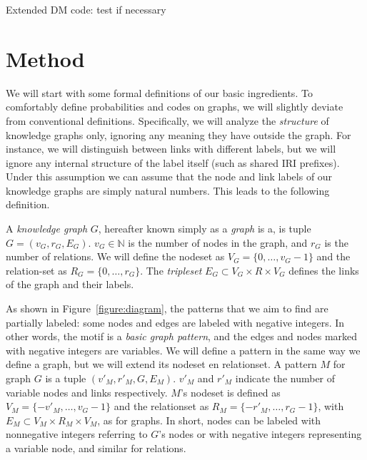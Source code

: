 \documentclass[11pt]{article}
\newcommand{\N}{{\mathbb N}}
\begin{document}
Extended DM code: test if necessary

\section{Method}

We will start with some formal definitions of our basic ingredients. To comfortably define probabilities and codes on graphs, we will slightly deviate from conventional definitions. Specifically, we will analyze the \emph{structure} of knowledge graphs only, ignoring any meaning they have outside the graph. For instance, we will distinguish between links with different labels, but we will ignore any internal structure of the label itself (such as shared IRI prefixes). Under this assumption we can assume that the node and link labels of our knowledge graphs are simply natural numbers. This leads to the following definition.

A \emph{knowledge graph} $G$, hereafter known simply as a \emph{graph} is a, is tuple $G = (v_G, r_G, E_G)$. $v_G \in \N$ is the number of nodes in the graph, and $r_G$ is the number of relations. We will define the nodeset as $V_G = \{0, \ldots, v_G-1\}$ and the relation-set as $R_G = \{0, \ldots, r_G\}$. The \emph{tripleset} $E_G \subset V_G \times R \times V_G$ defines the links of the graph and their labels. \footnotemark


As shown in Figure~\ref{figure:diagram}, the patterns that we aim to find are partially labeled: some nodes and edges are labeled with negative integers. In other words, the motif is a \emph{basic graph pattern}, and the edges and nodes marked with negative integers are variables. We will define a pattern in the same way we define a graph, but we will extend its nodeset en relationset. A pattern $M$ for graph $G$ is a tuple $(v'_M, r'_M, G, E_M)$. $v'_M$ and $r'_M$ indicate the number of variable nodes and links respectively. $M$'s nodeset is defined as $V_M = \{-v'_M, \ldots, v_G-1\}$ and the relationset as $R_M = \{-r'_M, \ldots, r_G-1\}$, with $E_M \subset V_M \times R_M \times V_M$, as for graphs. In short, nodes can be labeled with nonnegative integers referring to $G$'s nodes or with negative integers representing a variable node, and similar for relations.
\end{document}
